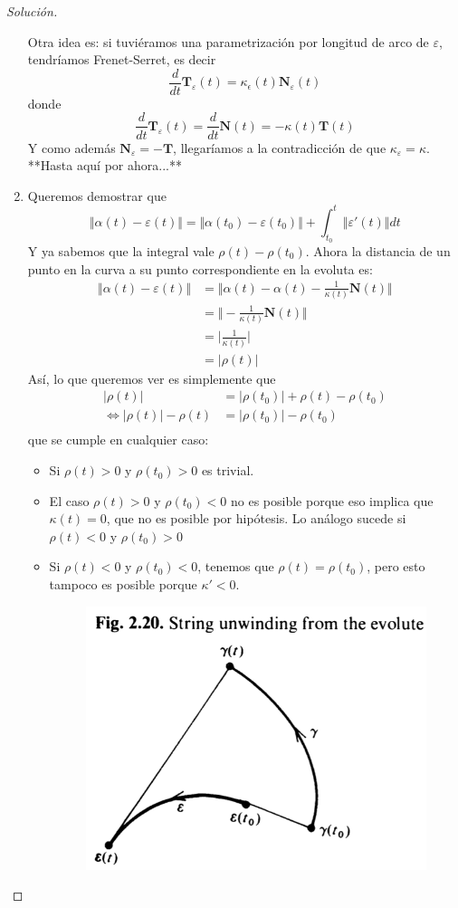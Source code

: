 \documentclass[spanish]{book}
\theoremstyle{definition}
\begin{document}
\begin{proof}[Solución]
\begin{enumerate}
		Otra idea es: si tuviéramos una parametrización por longitud de arco de $\varepsilon$, tendríamos Frenet-Serret, es decir
		\[\frac{d}{dt}\mathbf{T}_\varepsilon(t)=\kappa_\epsilon(t)\mathbf{N}_\varepsilon(t)\]
		donde
		\[\frac{d}{dt}\mathbf{T}_\varepsilon(t)=\frac{d}{dt}\mathbf{N}(t)=-\kappa(t)\mathbf{T}(t)\]
		Y como además $\mathbf{N}_\varepsilon=-\mathbf{T}$, llegaríamos a la contradicción de que $\kappa_\varepsilon=\kappa$. **Hasta aquí por ahora...**
		\item Queremos demostrar que
		\[\Vert\alpha(t)-\varepsilon(t)\Vert=\Vert\alpha(t_0)-\varepsilon(t_0)\Vert+\int_{t_0}^t\Vert\varepsilon'(t)\Vert dt\]
		Y ya sabemos que la integral vale $\rho(t)-\rho(t_0)$. Ahora la distancia de un punto en la curva a su punto correspondiente en la evoluta es:
		\begin{align*}
			\Vert\alpha(t)-\varepsilon(t)\Vert&=\Big\Vert\alpha(t)-\alpha(t)-\frac{1}{\kappa(t)}\mathbf{N}(t)\Big\Vert\\
			&=\Big\Vert-\frac{1}{\kappa(t)}\mathbf{N}(t)\Big\Vert\\
			&=\Big|\frac{1}{\kappa(t)}\Big|\\
			&=|\rho(t)|
		\end{align*}
		Así, lo que queremos ver es simplemente que 
		\begin{align*}
			|\rho(t)|&=|\rho(t_0)|+\rho(t)-\rho(t_0)\\
			\iff |\rho(t)|-\rho(t)&=|\rho(t_0)|-\rho(t_0)\\
		\end{align*}
		   que se cumple en cualquier caso:
		\begin{itemize}
			\item Si $\rho(t)>0$ y $\rho(t_0)>0$ es trivial.
			\item El caso $\rho(t)>0$ y $\rho(t_0)<0$ no es posible porque eso implica que $\kappa(t)=0$, que no es posible por hipótesis. Lo análogo sucede si $\rho(t)<0$ y $\rho(t_0)>0$
			\item Si $\rho(t)<0$ y $\rho(t_0)<0$, tenemos que $\rho(t)=\rho(t_0)$, pero esto tampoco es posible porque $\kappa'<0$.
			\begin{figure}
				\centering
				\includegraphics[width=0.4\linewidth]{curvas5}
			\end{figure}
		\end{itemize}
	\end{enumerate}
\end{proof}
\end{document}
